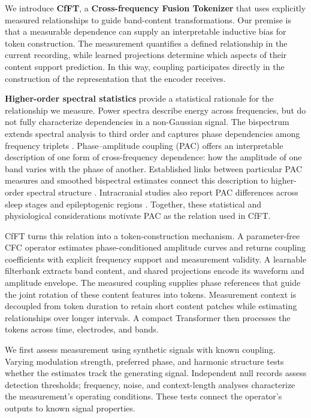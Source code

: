 \documentclass[10pt,twocolumn,letterpaper]{article}
\begin{document}
We introduce \textbf{CfFT}, a \textbf{Cross-frequency Fusion Tokenizer}
that uses explicitly measured relationships to guide band-content
transformations. Our premise is that a measurable dependence can supply
an interpretable inductive bias for token construction. The measurement
quantifies a defined relationship in the current recording, while learned
projections determine which aspects of their content support prediction.
In this way, coupling participates directly in the construction of the
representation that the encoder receives.

\textbf{Higher-order spectral statistics} provide a statistical rationale
for the relationship we measure. Power spectra describe energy across
frequencies, but do not fully characterize dependencies in a non-Gaussian
signal. The bispectrum extends spectral analysis to third order and
captures phase dependencies among frequency triplets
\citep{sigl1994introduction,kovach2018bispectrum}.
Phase--amplitude coupling (PAC) offers an interpretable description of
one form of cross-frequency dependence: how the amplitude of one band
varies with the phase of another. Established links between particular
PAC measures and smoothed bispectral estimates connect this description
to higher-order spectral structure \citep{kovach2018bispectrum}.
Intracranial studies also report PAC
differences across sleep stages and epileptogenic regions
\citep{amiri2016phase}. Together, these statistical and physiological
considerations motivate PAC as the relation used in CfFT.

CfFT turns this relation into a token-construction mechanism. A
parameter-free CFC operator estimates phase-conditioned amplitude curves
and returns coupling coefficients with explicit frequency support and
measurement validity. A learnable filterbank extracts band content, and
shared projections encode its waveform and amplitude envelope. The
measured coupling supplies phase references that guide the joint rotation
of these content features into tokens. Measurement context is decoupled
from token duration to retain short content patches while estimating
relationships over longer intervals. A compact Transformer then processes
the tokens across time, electrodes, and bands.

We first assess measurement using synthetic signals with known coupling.
Varying modulation strength, preferred phase, and harmonic structure tests
whether the estimates track the generating signal. Independent null
records assess detection thresholds; frequency, noise, and context-length
analyses characterize the measurement's operating conditions. These tests
connect the operator's outputs to known signal properties.
\end{document}
